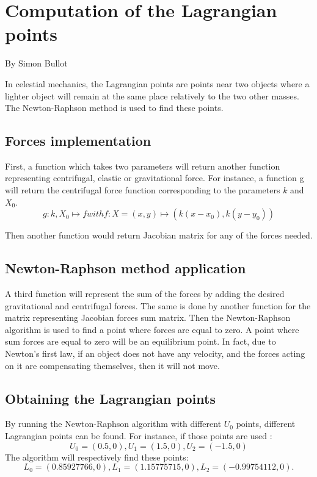 \documentclass{article}
\begin{document}
\newpage
\section{Computation of the Lagrangian points}

\begin{flushright}
By Simon Bullot
\end{flushright}

In celestial mechanics, the Lagrangian points are points near two objects where a lighter object will remain at the same place relatively to the two other masses. The Newton-Raphson method is used to find these points.

\subsection{Forces implementation}

First, a function which takes two parameters will return another function representing centrifugal, elastic or gravitational force. For instance, a function g will return the centrifugal force function corresponding to the parameters $k$ and $X_0$.
\[g:k,X_{0} \mapsto f with f : X = (x,y) \mapsto (k(x-x_{0}),k(y-y_{0}))\]


Then another function would return Jacobian matrix for any of the forces needed.

\subsection{Newton-Raphson method application}

A third function will represent the sum of the forces by adding the desired gravitational and centrifugal forces. The same is done by another function for the matrix representing Jacobian forces sum matrix. Then the Newton-Raphson algorithm is used to find a point where forces are equal to zero. A point where sum forces are equal to zero will be an equilibrium point. In fact, due to Newton's first law, if an object does not have any velocity, and the forces acting on it are compensating themselves, then it will not move.

\subsection{Obtaining the Lagrangian points}

By running the Newton-Raphson algorithm with different $U_{0}$ points, different Lagrangian points can be found.
For instance, if those points are used :
\[U_0 = (0.5, 0), U_1 = (1.5, 0), U_2 = (-1.5, 0) \]
The algorithm will respectively find these points:
\[L_0 = ( 0.85927766, 0 ), L_1 =  (1.15775715, 0 ), L_2 = (-0.99754112, 0 ).\] 
\end{document}
